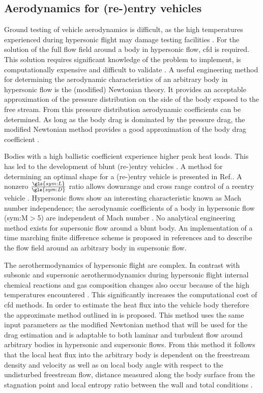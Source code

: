 \subsection{Aerodynamics for (re-)entry vehicles} \label{sec:aero}
Ground testing of vehicle aerodynamics is difficult, as the high temperatures experienced during hypersonic flight may damage testing facilities \cite{AndersonJr.2006, Bertin1994}. For the solution of the full flow field around a body in hypersonic flow, \gls{cfd} is required. This solution requires significant knowledge of the problem to implement, is computationally expensive and difficult to validate \cite{AndersonJr.2006, Bertin1994}. A useful engineering method for determining the aerodynamic characteristics of an arbitrary body in hypersonic flow is the (modified) Newtonian theory. It provides an acceptable approximation of the pressure distribution on the side of the body exposed to the free stream. From this pressure distribution aerodynamic coefficients can be determined. As long as the body drag is dominated by the pressure drag, the modified Newtonian method provides a good approximation of the body drag coefficient \cite{AndersonJr.2006, Bertin1994, Bertin2006}. 

Bodies with a high ballistic coefficient experience higher peak heat loads. This has led to the development of blunt (re-)entry vehicles \cite{Bertin1994,Theisinger2009}. A method for determining an optimal shape for a (re-)entry vehicle is presented in Ref.\cite{Theisinger2009}. A nonzero $\frac{\gls{sym:L}}{\gls{sym:D}}$ ratio allows downrange and cross range control of a reentry vehicle \cite{Theisinger2009}. Hypersonic flows show an interesting characteristic known as Mach number independence; the aerodynamic coefficients of a body in hypersonic flow (\gls{sym:M}$>$5) are independent of Mach number \cite{Bertin1994,AndersonJr.2007,Hollis}. No analytical engineering method exists for supersonic flow around a blunt body. An implementation of a time marching finite difference scheme is proposed in references \cite{AndersonJr.2007} and \cite{AndersonJr.2006} to describe the flow field around an arbitrary body in supersonic flow. 

The aerothermodynamics of hypersonic flight are complex. In contrast with subsonic and supersonic aerothermodynamics during hypersonic flight internal chemical reactions and gas composition changes also occur because of the high temperatures encountered \cite{AndersonJr.2006}. This significantly increases the computational cost of \gls{cfd} methods. In order to estimate the heat flux into the vehicle body therefore the approximate method outlined in \cite{Tauber1986, AndersonJr.2006} is proposed. This method uses the same input parameters as the modified Newtonian method that will be used for the drag estimation and is adaptable to both laminar and turbulent flow around arbitrary bodies in hypersonic and supersonic flows. From this method it follows that the local heat flux into the arbitrary body is dependent on the freestream density and velocity as well as on local body angle with respect to the undisturbed freestream flow, distance measured along the body surface from the stagnation point and local entropy ratio between the wall and total conditions \cite{Tauber1986, AndersonJr.2006}.
